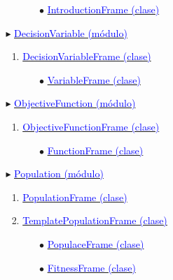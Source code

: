 \documentclass[12pt,twoside]{article}
\begin{document}
\begin{itemize}
\begin{enumerate}[$\square$]
\begin{itemize}
\begin{enumerate}[$\triangleright$]
\begin{itemize}
                        \item[$\bullet$] \hyperref[sec:a_3_2_1_1_1]{\textcolor{blue}{IntroductionFrame (clase)}}
                        \end{itemize}
                  \end{enumerate}
            \item[$\blacktriangleright$] \hyperref[sec:a_3_2_2]{\textcolor{blue}{DecisionVariable (módulo)}}
                  \begin{enumerate}[$\triangleright$]
                  \item \hyperref[sec:a_3_2_2_1]{\textcolor{blue}{DecisionVariableFrame (clase)}}
                        \begin{itemize}
                        \item[$\bullet$] \hyperref[sec:a_3_2_2_1_1]{\textcolor{blue}{VariableFrame (clase)}}
                        \end{itemize}
                  \end{enumerate}
            \item[$\blacktriangleright$] \hyperref[sec:a_3_2_3]{\textcolor{blue}{ObjectiveFunction (módulo)}}
                  \begin{enumerate}[$\triangleright$]
                  \item \hyperref[sec:a_3_2_3_1]{\textcolor{blue}{ObjectiveFunctionFrame (clase)}}
                        \begin{itemize}
                        \item[$\bullet$] \hyperref[sec:a_3_2_3_1_1]{\textcolor{blue}{FunctionFrame (clase)}}
                        \end{itemize}
                  \end{enumerate}
            \item[$\blacktriangleright$] \hyperref[sec:a_3_2_4]{\textcolor{blue}{Population (módulo)}}
                  \begin{enumerate}[$\triangleright$]
                  \item \hyperref[sec:a_3_2_4_1]{\textcolor{blue}{PopulationFrame (clase)}}
                  \item \hyperref[sec:a_3_2_4_2]{\textcolor{blue}{TemplatePopulationFrame (clase)}}
                        \begin{itemize}
                        \item[$\bullet$] \hyperref[sec:a_3_2_4_2_1]{\textcolor{blue}{PopulaceFrame (clase)}}
                        \item[$\bullet$] \hyperref[sec:a_3_2_4_2_2]{\textcolor{blue}{FitnessFrame (clase)}}

\end{itemize}
\end{enumerate}
\end{itemize}
\end{enumerate}
\end{itemize}
\end{document}
